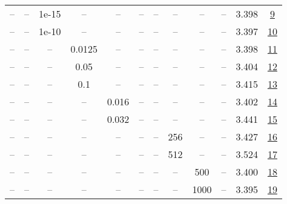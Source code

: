 \begin{table}[H]
\begin{tabular}{cccccccccccc}
-- & -- & 1e-15 & -- & -- & -- & -- & -- & -- & -- & 3.398 & \href{https://wandb.ai/stanford-mercury/optimizer-scaling/runs/sweep-130m-5B-mars773994lr0.008-wd0.1-minlr0-warmup2000-b10.95-b-402a1d}{9} \\
-- & -- & 1e-10 & -- & -- & -- & -- & -- & -- & -- & 3.397 & \href{https://wandb.ai/stanford-mercury/optimizer-scaling/runs/sweep-130m-5B-mars857a95lr0.008-wd0.1-minlr0-warmup2000-b10.95-b-338f34}{10} \\
-- & -- & -- & 0.0125 & -- & -- & -- & -- & -- & -- & 3.398 & \href{https://wandb.ai/stanford-mercury/optimizer-scaling/runs/sweep-130m-5B-marsf03129lr0.008-wd0.1-minlr0-warmup2000-b10.95-b-8ea8ad}{11} \\
-- & -- & -- & 0.05 & -- & -- & -- & -- & -- & -- & 3.404 & \href{https://wandb.ai/stanford-mercury/optimizer-scaling/runs/sweep-130m-5B-marspd43f88lr0.008-wd0.1-minlr0-warmup2000-b10.95--050b21}{12} \\
-- & -- & -- & 0.1 & -- & -- & -- & -- & -- & -- & 3.415 & \href{https://wandb.ai/stanford-mercury/optimizer-scaling/runs/sweep-130m-5B-marsd28047lr0.008-wd0.1-minlr0-warmup2000-b10.95-b-0571c3}{13} \\
-- & -- & -- & -- & 0.016 & -- & -- & -- & -- & -- & 3.402 & \href{https://wandb.ai/stanford-mercury/optimizer-scaling/runs/sweep-130m-5B-mars0c1462lr0.016-wd0.1-minlr0-warmup2000-b10.95-b-d9744e}{14} \\
-- & -- & -- & -- & 0.032 & -- & -- & -- & -- & -- & 3.441 & \href{https://wandb.ai/stanford-mercury/optimizer-scaling/runs/sweep-130m-5B-mars67d195lr0.032-wd0.1-minlr0-warmup2000-b10.95-b-b5b9ca}{15} \\
-- & -- & -- & -- & -- & -- & -- & 256 & -- & -- & 3.427 & \href{https://wandb.ai/stanford-mercury/optimizer-scaling/runs/sweep-130m-5B-marsfc8923lr0.008-wd0.1-minlr0-warmup2000-b10.95-b-1bbff7}{16} \\
-- & -- & -- & -- & -- & -- & -- & 512 & -- & -- & 3.524 & \href{https://wandb.ai/stanford-mercury/optimizer-scaling/runs/sweep-130m-5B-marsp4f0718lr0.008-wd0.1-minlr0-warmup2000-b10.95--094fbe}{17} \\
-- & -- & -- & -- & -- & -- & -- & -- & 500 & -- & 3.400 & \href{https://wandb.ai/stanford-mercury/optimizer-scaling/runs/sweep-130m-5B-marsp30b7b9lr0.008-wd0.1-minlr0-warmup500-b10.95-b-547d93}{18} \\
-- & -- & -- & -- & -- & -- & -- & -- & 1000 & -- & 3.395 & \href{https://wandb.ai/stanford-mercury/optimizer-scaling/runs/sweep-130m-5B-mars176a59lr0.008-wd0.1-minlr0-warmup1000-b10.95-b-ab41f8}{19} \\

\end{tabular}
\end{table}
